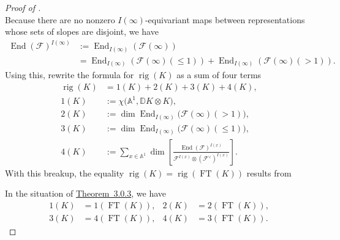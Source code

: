 \begin{proof}[Proof of \chthreethmthreezerothree]
\[\]
Because there are no nonzero \(I(\infty)\)-equivariant maps between
representations whose sets of slopes are disjoint, we have
\[
\begin{aligned}
  \operatorname{End}(\mathcal{F})^{I(\infty)}
  &:= \operatorname{End}_{I(\infty)}(\mathcal{F}(\infty)) \\
  &=
  \operatorname{End}_{I(\infty)}(\mathcal{F}(\infty)(\leq 1))
  +
  \operatorname{End}_{I(\infty)}(\mathcal{F}(\infty)(>1)).
\end{aligned}
\]
Using this, rewrite the formula for \(\operatorname{rig}(K)\) as a sum of
four terms
\[
\begin{aligned}
  \operatorname{rig}(K)&=1(K)+2(K)+3(K)+4(K),\\
  1(K)&:=\chi\bigl(\mathbb{A}^1,\mathbb{D}K\otimes K\bigr),\\
  2(K)&:=\dim\operatorname{End}_{I(\infty)}
        \bigl(\mathcal{F}(\infty)(>1)\bigr),\\
  3(K)&:=\dim\operatorname{End}_{I(\infty)}
        \bigl(\mathcal{F}(\infty)(\leq 1)\bigr),\\
  4(K)&:=
  \sum_{x\in\mathbb{A}^1}
       \dim\left[
       \frac{\operatorname{End}(\mathcal{F})^{I(x)}}
            {\mathcal{F}^{I(x)}\otimes(\mathcal{F}^{\vee})^{I(x)}}\right].
\end{aligned}
\]
With this breakup, the equality
\(\operatorname{rig}(K)=\operatorname{rig}(\operatorname{FT}(K))\) results
from

In the situation of \hyperref[thm:3.0.3]{Theorem~3.0.3}, we have
\[
\begin{aligned}
  1(K)&=1(\operatorname{FT}(K)),&
  2(K)&=2(\operatorname{FT}(K)),\\
  3(K)&=4(\operatorname{FT}(K)),&
  4(K)&=3(\operatorname{FT}(K)).
\end{aligned}
\]
\end{proof}

